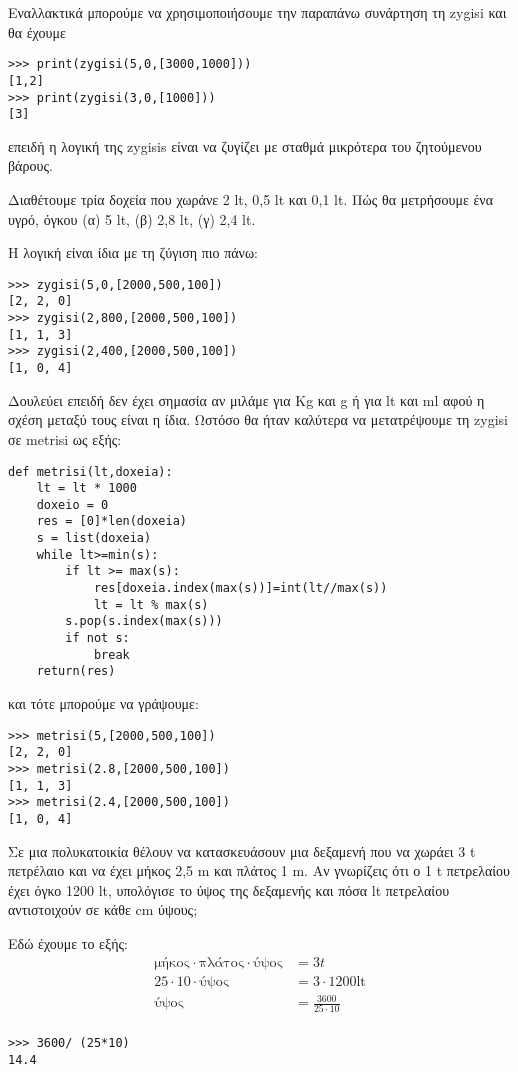 Εναλλακτικά μπορούμε να χρησιμοποιήσουμε την παραπάνω συνάρτηση τη zygisi και θα έχουμε
\begin{lstlisting}
>>> print(zygisi(5,0,[3000,1000]))
[1,2]
>>> print(zygisi(3,0,[1000]))
[3]
\end{lstlisting}
επειδή η λογική της zygisis είναι να ζυγίζει με σταθμά μικρότερα του ζητούμενου βάρους.
\begin{exercise}
Διαθέτουμε τρία δοχεία που χωράνε 2 lt, 0,5 lt και 0,1 lt. Πώς θα μετρήσουμε ένα υγρό, όγκου (α) 5 lt, (β) 2,8 lt, (γ) 2,4 lt. 
\end{exercise}
Η λογική είναι ίδια με τη ζύγιση πιο πάνω:
\begin{lstlisting}
>>> zygisi(5,0,[2000,500,100])
[2, 2, 0]
>>> zygisi(2,800,[2000,500,100])
[1, 1, 3]
>>> zygisi(2,400,[2000,500,100])
[1, 0, 4]
\end{lstlisting}
Δουλεύει επειδή δεν έχει σημασία αν μιλάμε για Kg και g ή για lt και ml αφού η σχέση μεταξύ τους είναι η ίδια.
Ωστόσο θα ήταν καλύτερα να μετατρέψουμε τη zygisi σε metrisi ως εξής:
\begin{lstlisting}
def metrisi(lt,doxeia):
    lt = lt * 1000
    doxeio = 0
    res = [0]*len(doxeia)
    s = list(doxeia)
    while lt>=min(s):
        if lt >= max(s):
            res[doxeia.index(max(s))]=int(lt//max(s))
            lt = lt % max(s)
        s.pop(s.index(max(s)))
        if not s:
            break
    return(res)
\end{lstlisting}
και τότε μπορούμε να γράψουμε:
\begin{lstlisting}
>>> metrisi(5,[2000,500,100])
[2, 2, 0]
>>> metrisi(2.8,[2000,500,100])
[1, 1, 3]
>>> metrisi(2.4,[2000,500,100])
[1, 0, 4]
\end{lstlisting}
\begin{exercise}
Σε μια πολυκατοικία θέλουν να κατασκευάσουν μια δεξαμενή που να χωράει 3 t πετρέλαιο και να έχει μήκος 2,5 m και πλάτος 1 m. Αν γνωρίζεις ότι ο 1 t πετρελαίου έχει όγκο 1200 lt, υπολόγισε το ύψος της δεξαμενής και πόσα lt πετρελαίου αντιστοιχούν σε κάθε cm ύψους;
\end{exercise}
Εδώ έχουμε το εξής:
\begin{eqnarray}
\textrm{μήκος}\cdot\textrm{πλάτος}\cdot\textrm{ύψος} & = 3t \\
25 \cdot 10 \cdot \textrm{ύψος}& = 3\cdot 1200\textrm{lt}\\
\textrm{ύψος} &= \frac{3600}{25\cdot 10}\\
\end{eqnarray}
\begin{lstlisting}
>>> 3600/ (25*10)
14.4
\end{lstlisting}

